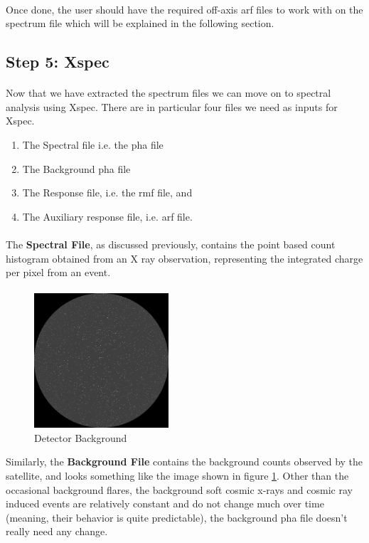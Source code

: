 \documentclass[a4paper,twoside]{report}
\numberwithin{equation}{section}
\begin{document}
\paragraph{}
Once done, the user should have the required off-axis arf files to work with on the spectrum file which will be explained in the following section.
\newpage
\subsection{Step 5: Xspec}
\paragraph{}
Now that we have extracted the spectrum files we can move on to spectral analysis using Xspec. There are in particular four files we need as inputs for Xspec.
\begin{enumerate}
\item The Spectral file i.e. the pha file
\item The Background pha file
\item The Response file, i.e. the rmf file, and 
\item The Auxiliary response file, i.e. arf file.
\end{enumerate}
\paragraph{}
The \textbf{Spectral File}, as discussed previously, contains the point based count histogram obtained from an X ray observation, representing the integrated charge per pixel from an event. 
\paragraph{}
\begin{figure}
\includegraphics[width=1.0\linewidth, height=5cm]{Background_crab.jpeg}
\caption{Detector Background}
\label{Back_sample}
\end{figure}
Similarly, the \textbf{Background File} contains the background counts observed by the satellite, and looks something like the image shown in figure \ref{Back_sample}. Other than the occasional background flares, the background  soft cosmic x-rays and cosmic ray induced events are relatively constant and do not change much over time (meaning, their behavior is quite predictable), the background pha file doesn't really need any change.
\end{document}
